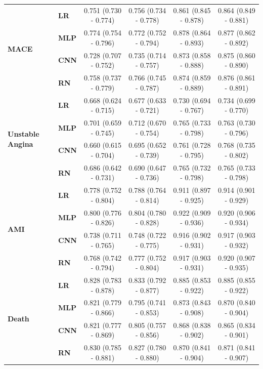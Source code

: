 \documentclass[preprint]{elsarticle}
\begin{document}
\begin{table}[H]
\begin{adjustbox}{center}
\begin{tabular}{@{}llcccc@{}}
\multirow{4}{*}{\begin{minipage}{0.65in}\textbf{MACE}\end{minipage}} %
& \textbf{LR} & 0.751 (0.730 - 0.774) & 0.756 (0.734 - 0.778) & 0.861 (0.845 - 0.878) & 0.864 (0.849 - 0.881) \\
& \textbf{MLP} & 0.774 (0.754 - 0.796) & 0.772 (0.752 - 0.794) & 0.878 (0.864 - 0.893) & 0.877 (0.862 - 0.892) \\
& \textbf{CNN} & 0.728 (0.707 - 0.752) & 0.735 (0.714 - 0.757) & 0.873 (0.858 - 0.888) & 0.875 (0.860 - 0.890) \\
& \textbf{RN} & 0.758 (0.737 - 0.779) & 0.766 (0.745 - 0.787) & 0.874 (0.859 - 0.889) & 0.876 (0.861 - 0.891) \\
  \cmidrule(lr){1-2}
\multirow{4}{*}{\begin{minipage}{0.65in}\textbf{Unstable Angina}\end{minipage}} %
& \textbf{LR} & 0.668 (0.624 - 0.715) & 0.677 (0.633 - 0.721) & 0.730 (0.694 - 0.767) & 0.734 (0.699 - 0.770) \\
& \textbf{MLP} & 0.701 (0.659 - 0.745) & 0.712 (0.670 - 0.754) & 0.765 (0.733 - 0.798) & 0.763 (0.730 - 0.796) \\
& \textbf{CNN} & 0.660 (0.615 - 0.704) & 0.695 (0.652 - 0.739) & 0.761 (0.728 - 0.795) & 0.768 (0.735 - 0.802) \\
& \textbf{RN} & 0.686 (0.642 - 0.731) & 0.690 (0.647 - 0.736) & 0.765 (0.732 - 0.798) & 0.765 (0.733 - 0.798) \\
  \cmidrule(lr){1-2}
\multirow{4}{*}{\begin{minipage}{0.65in}\textbf{AMI}\end{minipage}} %
& \textbf{LR} & 0.778 (0.752 - 0.804) & 0.788 (0.764 - 0.814) & 0.911 (0.897 - 0.925) & 0.914 (0.901 - 0.929) \\
& \textbf{MLP} & 0.800 (0.776 - 0.826) & 0.804 (0.780 - 0.828) & 0.922 (0.909 - 0.936) & 0.920 (0.906 - 0.934) \\
& \textbf{CNN} & 0.738 (0.711 - 0.765) & 0.748 (0.722 - 0.775) & 0.916 (0.902 - 0.931) & 0.917 (0.903 - 0.932) \\
& \textbf{RN} & 0.768 (0.742 - 0.794) & 0.777 (0.752 - 0.804) & 0.917 (0.903 - 0.931) & 0.920 (0.907 - 0.935) \\
  \cmidrule(lr){1-2}
\multirow{4}{*}{\begin{minipage}{0.65in}\textbf{Death}\end{minipage}} %
& \textbf{LR} & 0.828 (0.783 - 0.878) & 0.833 (0.792 - 0.877) & 0.885 (0.853 - 0.922) & 0.885 (0.855 - 0.922) \\
& \textbf{MLP} & 0.821 (0.779 - 0.866) & 0.795 (0.741 - 0.853) & 0.873 (0.843 - 0.908) & 0.870 (0.840 - 0.904) \\
& \textbf{CNN} & 0.821 (0.777 - 0.869) & 0.805 (0.757 - 0.856) & 0.868 (0.838 - 0.902) & 0.865 (0.834 - 0.901) \\
& \textbf{RN} & 0.830 (0.785 - 0.881) & 0.827 (0.780 - 0.880) & 0.870 (0.841 - 0.904) & 0.871 (0.841 - 0.907) \\


\end{tabular}
\end{adjustbox}
\end{table}
\end{document}
